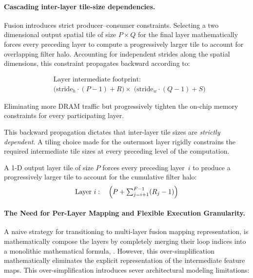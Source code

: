 \documentclass[11pt,a4paper,twocolumn]{article}
\begin{document}
\paragraph{Cascading inter-layer tile-size dependencies.}
Fusion introduces strict producer--consumer constraints.
Selecting a two dimensional output spatial tile of size $P \times Q$ for the final layer mathematically forces every preceding layer to compute a progressively larger tile to account for overlapping filter halo. Accounting for independent strides along the spatial dimensions, this constraint propagates backward according to:

\begin{equation*}
\begin{split}
  &\text{Layer } \text{intermediate footprint:} \\ 
  &\bigl(\text{stride}_h \cdot (P - 1) + R\bigr) \times\; \bigl(\text{stride}_w \cdot (Q - 1) + S\bigr)
\end{split}
\end{equation*}

Eliminating more DRAM traffic but
progressively tighten the on-chip memory constraints for every
participating layer.

This backward propagation dictates that inter-layer tile sizes are \emph{strictly dependent}. A tiling choice made for the outermost layer rigidly constrains the required intermediate tile sizes at every preceding level of the computation. 


A 1-D output layer tile of size $P$ forces every
preceding layer~$i$ to produce a progressively larger tile to account
for the cumulative filter halo:
%
\begin{equation}
  \text{Layer } i: \quad
  \Bigl(P + \textstyle\sum_{j=i+1}^{F-1}(R_j - 1)\Bigr)
\end{equation}
%


\paragraph{The Need for Per-Layer Mapping and Flexible Execution Granularity.} 
A naive strategy for transitioning to multi-layer fusion mapping representation, is mathematically compose the layers by completely merging their loop indices into a monolithic mathematical formula, . However, this over-simplification mathematically eliminates the explicit representation of the intermediate feature maps. This over-simplification introduces sever architectural modeling limitations:
\end{document}
